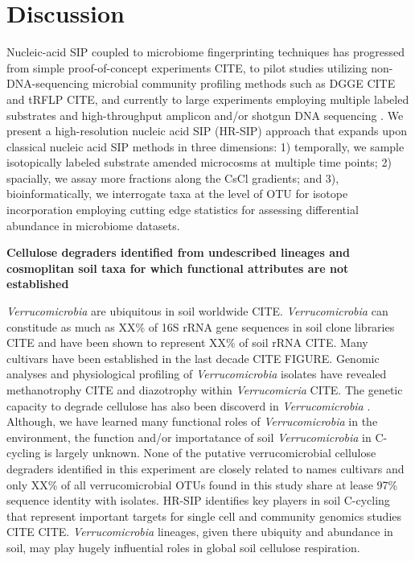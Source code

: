\section{Discussion}
Nucleic-acid SIP coupled to microbiome fingerprinting techniques has progressed
from simple proof-of-concept experiments  CITE, to pilot studies utilizing
non-DNA-sequencing microbial community profiling methods such as DGGE CITE and
tRFLP CITE, and currently to large experiments employing multiple 
labeled substrates and high-throughput amplicon and/or shotgun DNA sequencing 
\citep{Verastegui_2014}. We present a high-resolution nucleic acid SIP (HR-SIP) 
approach that expands upon classical nucleic acid SIP methods in three dimensions:
1) temporally, we sample isotopically labeled substrate amended microcosms at multiple 
time points; 2) spacially, we assay more fractions along the CsCl gradients; and 3), 
bioinformatically, we interrogate taxa at the level of OTU for isotope incorporation
employing cutting edge statistics for assessing differential abundance in microbiome
datasets.

\textbf{Cellulose degraders identified from undescribed lineages and cosmoplitan
soil taxa for which functional attributes are not established}

\textit{Verrucomicrobia} are ubiquitous in soil worldwide CITE. \textit{Verrucomicrobia} 
can constitude as much as XX\% of 16S rRNA gene sequences in soil clone libraries CITE and
have been shown to represent XX\% of soil rRNA CITE. Many  cultivars
have been established in the last decade CITE FIGURE. Genomic analyses and physiological 
profiling of \textit{Verrucomicrobia} isolates have revealed methanotrophy CITE and diazotrophy 
within \textit{Verrucomicria} CITE. The genetic capacity to degrade cellulose
has also been discoverd in \textit{Verrucomicrobia} \citep{Wertz_2011}. Although, we have
learned many functional roles of \textit{Verrucomicrobia} in the environment, the function and/or
importatance of soil \textit{Verrucomicrobia} in C-cycling is largely unknown. None of the 
putative verrucomicrobial cellulose degraders identified in this experiment are closely related
to names cultivars and only XX\% of all verrucomicrobial OTUs found in this study share at lease
97\% sequence identity with isolates. HR-SIP identifies key players in soil C-cycling that
represent important targets for single cell and community genomics studies CITE CITE. 
\textit{Verrucomicrobia} lineages, given there ubiquity and abundance in soil, may play 
hugely influential roles in global soil cellulose respiration.

